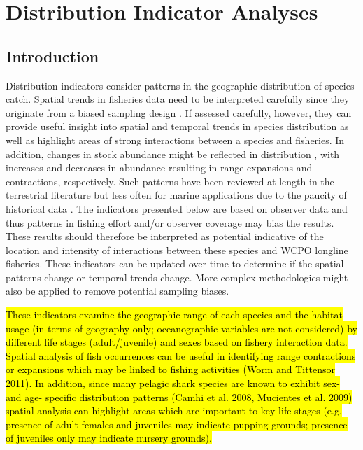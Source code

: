 \documentclass[12pt]{SCreport}
\begin{document}
        
             
        
\section{Distribution Indicator Analyses}
      \subsection{Introduction}

      Distribution indicators consider patterns in the geographic distribution of species catch. Spatial trends in fisheries data need to be interpreted carefully since they originate from a biased sampling design \citep{Walters2003_a}. If assessed carefully, however, they can provide useful insight into spatial and temporal trends in species distribution as well as highlight areas of strong interactions between a species and fisheries. In addition, changes in stock abundance might be reflected in distribution \citep{MacCall1990}, with increases and decreases in abundance resulting in range expansions and contractions, respectively. Such patterns have been reviewed at length in the terrestrial literature \citep{Borregaard2010_a} but less often for marine applications due to the paucity of historical data \citep[but see][]{Worm2011_a}. The indicators presented below are based on observer data and thus patterns in fishing effort and/or observer coverage may bias the results.  These results should therefore be interpreted as potential indicative of the location and intensity of interactions between these species and WCPO longline fisheries.  These indicators can be updated over time to determine if the spatial patterns change or temporal trends change.  More complex methodologies might also be applied to remove potential sampling biases.
      
\hl{These indicators examine the geographic range of each species and the habitat usage (in terms of geography only; oceanographic variables are not considered) by different life stages (adult/juvenile) and sexes based on fishery interaction data. Spatial analysis of fish occurrences can be useful in identifying range contractions or expansions which may be linked to fishing activities (Worm and Tittensor 2011). In addition, since many pelagic shark species are known to exhibit sex- and age- specific distribution patterns (Camhi et al. 2008, Mucientes et al. 2009) spatial analysis can highlight areas which are important to key life stages (e.g. presence of adult females and juveniles may indicate pupping grounds; presence of juveniles only may indicate nursery grounds).}
      
\end{document}
